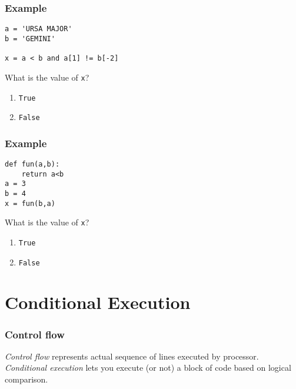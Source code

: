 \documentclass[11pt]{beamer}
\begin{document}
\begin{frame}[fragile]
  \frametitle{Example}
  \Enlarge

  \begin{Verbatim}[commandchars=\\\{\},commentchar=\%]
a = 'URSA MAJOR'
b = 'GEMINI'

x = a < b and a[1] != b[-2]
  \end{Verbatim}
  What is the value of \texttt{x}?
  \begin{enumerate}[label=\Alph*]
  \item  \texttt{True}
  \item  \texttt{False}  %
  \end{enumerate}
\end{frame}

\begin{frame}[fragile]
  \frametitle{Example}
  \Enlarge

  \begin{Verbatim}[commandchars=\\\{\},commentchar=\%]
def fun(a,b):
    return a<b
a = 3
b = 4
x = fun(b,a)
  \end{Verbatim}
  What is the value of \texttt{x}?
  \begin{enumerate}[label=\Alph*]
  \item  \texttt{True}
  \item  \texttt{False} %
  \end{enumerate}
\end{frame}

\section{Conditional Execution}

\begin{frame}[fragile]
  \frametitle{Control flow}
  \Enlarge

  \begin{itemize}
  \myitem  \emph{Control flow} represents actual sequence of lines executed by processor. %
  \myitem  \emph{Conditional execution} lets you execute (or not) a block of code based on logical comparison.
  \end{itemize}
\end{frame}
\end{document}
